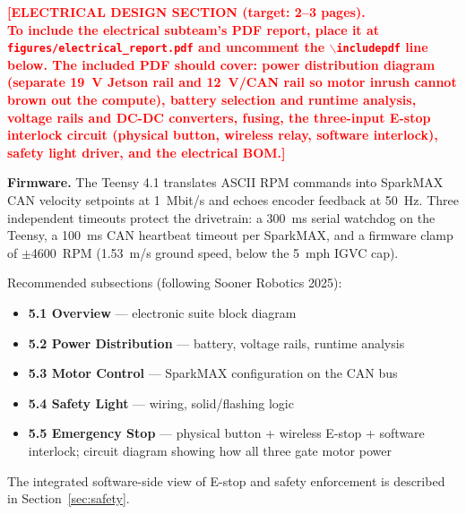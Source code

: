 \documentclass[11pt, letterpaper]{article}
\newcommand{\placeholder}[1]{\textcolor{red}{\textbf{[#1]}}}
\begin{document}
\placeholder{ELECTRICAL DESIGN SECTION (target: 2--3 pages).\\[0.5em]
To include the electrical subteam's PDF report, place it at\\
\texttt{figures/electrical\_report.pdf} and uncomment the \texttt{$\backslash$includepdf} line below.
The included PDF should cover: power distribution diagram (separate 19~V Jetson rail and
12~V/CAN rail so motor inrush cannot brown out the compute), battery selection and runtime
analysis, voltage rails and DC-DC converters, fusing, the three-input E-stop interlock
circuit (physical button, wireless relay, software interlock), safety light driver, and
the electrical BOM.}

% 

\vspace{0.5em}

\textbf{Firmware.} The Teensy 4.1 translates ASCII RPM commands into SparkMAX CAN velocity
setpoints at 1~Mbit/s and echoes encoder feedback at 50~Hz. Three independent timeouts
protect the drivetrain: a 300~ms serial watchdog on the Teensy, a 100~ms CAN heartbeat
timeout per SparkMAX, and a firmware clamp of $\pm$4600~RPM (1.53~m/s ground speed, below
the 5~mph IGVC cap).

Recommended subsections (following Sooner Robotics 2025):
\begin{itemize}
    \item \textbf{5.1 Overview} --- electronic suite block diagram
    \item \textbf{5.2 Power Distribution} --- battery, voltage rails, runtime analysis
    \item \textbf{5.3 Motor Control} --- SparkMAX configuration on the CAN bus
    \item \textbf{5.4 Safety Light} --- wiring, solid/flashing logic
    \item \textbf{5.5 Emergency Stop} --- physical button + wireless E-stop + software interlock; circuit diagram showing how all three gate motor power
\end{itemize}

The integrated software-side view of E-stop and safety enforcement is described in
Section~\ref{sec:safety}.

\end{document}
